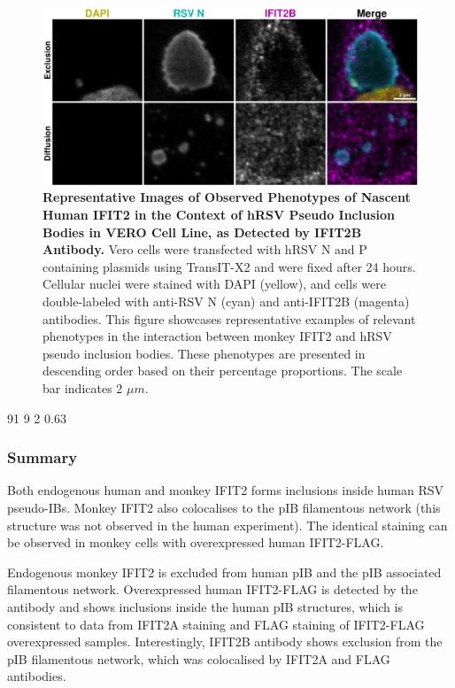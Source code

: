 \begin{figure}
    \centering
    \includegraphics[width=1\linewidth]{09. Chapter 4/Figs/02. pIB/03. IFIT2B/06. i2b-vero-hnhp.pdf} 
    \caption[Representative Images of Observed Phenotypes of Nascent Human IFIT2 in the Context of hRSV Pseudo Inclusion Bodies in VERO Cell Line, as Detected by IFIT2B Antibody.]{\textbf{Representative Images of Observed Phenotypes of Nascent Human IFIT2 in the Context of hRSV Pseudo Inclusion Bodies in VERO Cell Line, as Detected by IFIT2B Antibody.} Vero cells were transfected with hRSV N and P containing plasmids using TransIT-X2 and were fixed after 24 hours. Cellular nuclei were stained with DAPI (yellow), and cells were double-labeled with anti-RSV N (cyan) and anti-IFIT2B (magenta) antibodies. This figure showcases representative examples of relevant phenotypes in the interaction between monkey IFIT2 and hRSV pseudo inclusion bodies. These phenotypes are presented in descending order based on their percentage proportions. The scale bar indicates 2 \(\mu m\).}
    \label{fig:Representative Images of Observed Phenotypes of Nascent Human IFIT2 in the Context of hRSV Pseudo Inclusion Bodies in VERO Cell Line, as Detected by IFIT2B Antibody}
\end{figure}

91 9
2 0.63

\subsubsection{Summary} \label{Summary-i2-pib}
Both endogenous human and monkey IFIT2 forms inclusions inside human RSV pseudo-IBs. Monkey IFIT2 also colocalises to the pIB filamentous network (this structure was not observed in the human experiment). The identical staining can be observed in monkey cells with overexpressed human IFIT2-FLAG.

Endogenous monkey IFIT2 is excluded from human pIB and the pIB associated filamentous network. Overexpressed human IFIT2-FLAG is detected by the antibody and shows inclusions inside the human pIB structures, which is consistent to data from IFIT2A staining and FLAG staining of IFIT2-FLAG overexpressed samples. Interestingly, IFIT2B antibody shows exclusion from the pIB filamentous network, which was colocalised by IFIT2A and FLAG antibodies.